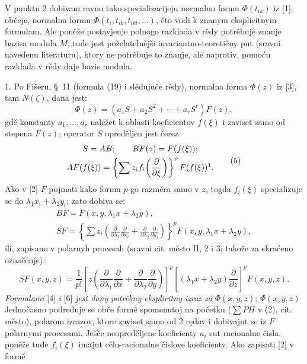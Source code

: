 \documentclass[11pt]{article}
\providecommand{\p}{\partial}
\begin{document}
V punktu 2 dobivam ravno tako specializacijeju normalnu formu \(\Phi(t_{ik})\) iz [1]; občeje, normalnu formu \(\Phi(t_i,t_{ik},t_{ikl},\ldots)\), čto vodi k znanym eksplicitnym formulam. Ale poněže postavjenje polnogo razklada v rědy potrěbuje znanje bazisa modula \(M\), tude jest poželatelnějši invariantno-teoretičny put (sravni navedenu literaturu), ktory ne potrěbuje to znanje, ale naprotiv, pomoću razklada v rědy daje bazis modula.

1. Po Fišeru, \S~11 (formula (19) i slědujuče rědy), normalna forma \(\Phi(z)\) iz [3], tam \(N(\zeta)\), dana jest:
\begin{equation}
        \Phi(z)=(a_1S+a_2S^2+\cdots+a_rS^r)F(z),
\tag{4}
\end{equation}
gdě konstanty \(a_1,\ldots,a_r\) naležet k oblasti koeficientov \(f(\xi)\) i zaviset samo od stepena \(F(z)\); operator \(S\) opreděljen jest čerez
\begin{equation}
\begin{gathered}
        S=AB;\qquad BF(z)=F(f(\xi));\\
        AF(f(\xi))=\left\{\sum z_i f_i\!\left(\frac{\p}{\p\xi}\right)\right\}^{p}F(f(\xi))\footnotemark.
\end{gathered}
\tag{5}
\end{equation}
Ako v [2] \(F\) pojmati kako formu \(p\)-go razměra samo v \(z\), togda \(f_i(\xi)\) specializuje se do \(\lambda_1x_i+\lambda_2y_i\); zato dobiva se:
\[
\begin{gathered}
        BF=F(x,y,\lambda_1x+\lambda_2y),\\
        SF=\left\{\sum z_i\left(\frac{\p}{\p\lambda_1}\frac{\p}{\p x_i}+
        \frac{\p}{\p\lambda_2}\frac{\p}{\p y_i}\right)\right\}^{p}
        F(x,y,\lambda_1x+\lambda_2y),
\end{gathered}
\]
ili, zapisano v polarnyh procesah (sravni cit. město II, 2 i 3; takože za skraćeno označenje):
\begin{equation}
        SF(x,y,z)=\frac1{p!}\left[z\left(\frac{\p}{\p\lambda_1}\frac{\p}{\p x}+
        \frac{\p}{\p\lambda_2}\frac{\p}{\p y}\right)\right]^p
        \left[(\lambda_1x+\lambda_2y)\frac{\p}{\p z}\right]^p F(x,y,z).
\tag{6}
\end{equation}
{\itshape Formulami} [4] {\itshape i} [6] {\itshape jest dany potrěbny eksplicitny izraz za} \(\Phi(x,y,z)\); \(\Phi(x,y,z)\) Jednočasno podređuje se obče formě spomenutoj na početku (\(\sum PH\) v (2), cit. město), polarom izrazov, ktore zaviset samo od 2 rędov i dobivajut se iz \(F\) polarnymi procesami. Ješče neopreděljene koeficienty \(a_i\) sut racionalne čisla, poněže tude \(f_i(\xi)\) imajut cělo-racionalne čislove koeficienty. Ako zapisati [2] v formě
\end{document}
